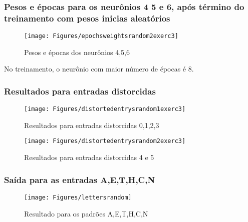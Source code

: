 \documentclass[hidelinks,12pt]{article}
\begin{document}
	\newpage
	\subsubsection{Pesos e épocas para os neurônios 4 5 e 6, após término do treinamento com pesos inicias aleatórios}

		\begin{figure}[h!]
			\centering
			\texttt{[image: Figures/epochsweightsrandom2exerc3]}
			\caption{Pesos e épocas dos neurônios 4,5,6}
		\end{figure}
		
		\normalsize No treinamento, o neurônio com maior número de épocas é 8.
		
	\newpage
	\subsubsection{Resultados para entradas distorcidas}

		\begin{figure}[h!]
			\centering
			\texttt{[image: Figures/distortedentrysrandom1exerc3]}
			\caption{Resultados para entradas distorcidas 0,1,2,3}
		\end{figure}
		
		\begin{figure}[h!]
			\centering
			\texttt{[image: Figures/distortedentrysrandom2exerc3]}
			\caption{Resultados para entradas distorcidas 4 e 5}
		\end{figure}

	
		

	\newpage
	\subsubsection{Saída para as entradas A,E,T,H,C,N}

		\begin{figure}[h!]
			\centering
			\texttt{[image: Figures/lettersrandom]}
			\caption{Resultado para os padrões A,E,T,H,C,N}
		\end{figure}
	
\end{document}
